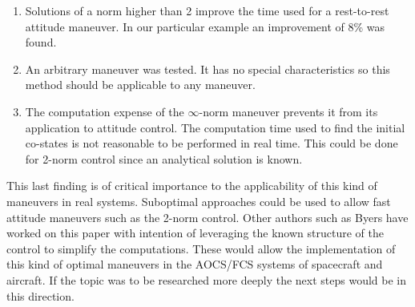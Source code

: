 \begin{enumerate}
	\item Solutions of a norm higher than 2 improve the time used for a rest-to-rest attitude maneuver. In our particular example an improvement of 8\% was found.
	
	\item An arbitrary maneuver was tested. It has no special characteristics so this method should be applicable to any maneuver.
	
	\item The computation expense of the $\infty$-norm maneuver prevents it from its application to attitude control. The computation time used to find the initial co-states is not reasonable to be performed in real time. This could be done for 2-norm control since an analytical solution is known.
\end{enumerate}

This last finding is of critical importance to the applicability of this kind of maneuvers in real systems. Suboptimal approaches could be used to allow fast attitude maneuvers such as the 2-norm control. Other authors such as Byers\cite{byers1993quasi} have worked on this paper with intention of leveraging the known structure of the control to simplify the computations. These would allow the implementation of this kind of optimal maneuvers in the AOCS/FCS systems of spacecraft and aircraft. If the topic was to be researched more deeply the next steps would be in this direction.
